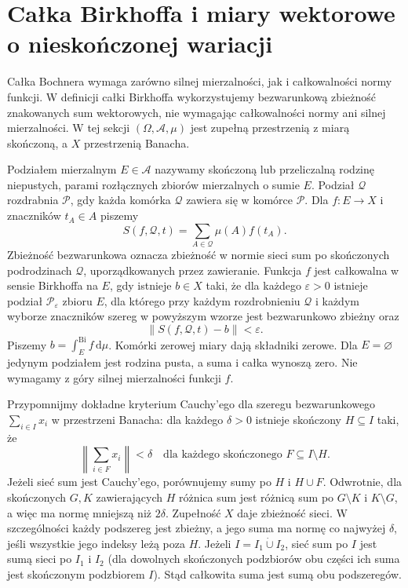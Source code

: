 \section{Całka Birkhoffa i miary wektorowe o nieskończonej wariacji}
\label{sec:birkhoff-30}

Całka Bochnera wymaga zarówno silnej mierzalności,
jak i całkowalności normy funkcji.
W definicji całki Birkhoffa wykorzystujemy
bezwarunkową zbieżność znakowanych sum wektorowych,
nie wymagając całkowalności normy ani silnej mierzalności. W tej sekcji
$(\Omega,\mathcal A,\mu)$ jest zupełną przestrzenią
z miarą skończoną, a $X$ przestrzenią Banacha.

\begin{definicja}
\label{def:birkhoff-30}
Podziałem mierzalnym $E\in\mathcal A$ nazywamy skończoną
lub przeliczalną rodzinę niepustych, parami rozłącznych
zbiorów mierzalnych o sumie $E$. Podział $\mathcal Q$
rozdrabnia $\mathcal P$, gdy każda komórka $\mathcal Q$
zawiera się w komórce $\mathcal P$.
Dla $f:E\to X$ i znaczników $t_A\in A$ piszemy
\[
 S(f,\mathcal Q,t)=\sum_{A\in\mathcal Q}\mu(A)f(t_A).
\]
Zbieżność bezwarunkowa oznacza zbieżność w normie sieci
sum po skończonych podrodzinach $\mathcal Q$,
uporządkowanych przez zawieranie.
Funkcja $f$ jest całkowalna w sensie Birkhoffa na $E$,
gdy istnieje $b\in X$ taki, że dla każdego $\varepsilon>0$
istnieje podział $\mathcal P_\varepsilon$ zbioru $E$,
dla którego przy każdym rozdrobnieniu $\mathcal Q$
i każdym wyborze znaczników szereg w powyższym wzorze
jest bezwarunkowo zbieżny oraz
\[
 \|S(f,\mathcal Q,t)-b\|<\varepsilon.
\]
Piszemy $b=\int_E^{\mathrm{Bi}}f\,\mathrm d\mu$.
Komórki zerowej miary dają składniki zerowe.
Dla $E=\varnothing$ jedynym podziałem jest rodzina
pusta, a suma i całka wynoszą zero.
Nie wymagamy z góry silnej mierzalności funkcji $f$.
\end{definicja}

Przypomnijmy dokładne kryterium Cauchy'ego dla szeregu
bezwarunkowego $\sum_{i\in I}x_i$ w przestrzeni Banacha:
dla każdego $\delta>0$ istnieje skończony $H\subseteq I$
taki, że
\[
 \left\|\sum_{i\in F}x_i\right\|<\delta
 \quad\text{dla każdego skończonego } F\subseteq I\setminus H.
\]
Jeżeli sieć sum jest Cauchy'ego, porównujemy sumy
po $H$ i $H\cup F$. Odwrotnie, dla skończonych
$G,K$ zawierających $H$ różnica sum jest różnicą
sum po $G\setminus K$ i $K\setminus G$,
a więc ma normę mniejszą niż $2\delta$.
Zupełność $X$ daje zbieżność sieci.
W szczególności każdy podszereg jest zbieżny,
a jego suma ma normę co najwyżej $\delta$, jeśli
wszystkie jego indeksy leżą poza $H$.
Jeżeli $I=I_1\dot\cup I_2$, sieć sum po $I$ jest
sumą sieci po $I_1$ i $I_2$ (dla dowolnych
skończonych podzbiorów obu części ich suma
jest skończonym podzbiorem $I$).
Stąd całkowita suma jest sumą obu podszeregów.


